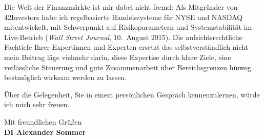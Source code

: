 \documentclass[10.5pt]{article}
\begin{document}
Die Welt der Finanzmärkte ist mir dabei nicht fremd: Als Mitgründer von 42Investors habe ich regelbasierte Handelssysteme für NYSE und NASDAQ mitentwickelt, mit Schwerpunkt auf Risikoparametern und Systemstabilität im Live-Betrieb (\emph{Wall Street Journal}, 10.~August 2015). Die aufsichtsrechtliche Fachtiefe Ihrer Expertinnen und Experten ersetzt das selbstverständlich nicht -- mein Beitrag läge vielmehr darin, diese Expertise durch klare Ziele, eine verlässliche Steuerung und gute Zusammenarbeit über Bereichsgrenzen hinweg bestmöglich wirksam werden zu lassen.

Über die Gelegenheit, Sie in einem persönlichen Gespräch kennenzulernen, würde ich mich sehr freuen.

\vspace{6pt}
Mit freundlichen Grüßen\\[16pt]
\textbf{DI Alexander Sommer}
\end{document}

